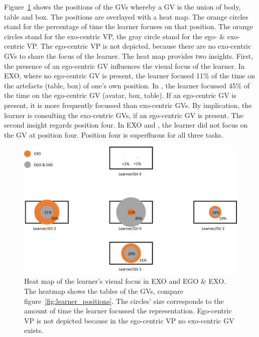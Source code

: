 Figure~\ref{fig:posHeatMap} shows the positions of the GVs whereby a GV is the union of body, table and box. The positions are overlayed with a heat map. The orange circles stand for the percentage of time the learner focuses on that position. The orange circles stand for the exo-centric VP, the gray circle stand for the ego- \& exo-centric VP. The ego-centric VP is not depicted, because there are no exo-centric GVs to share the focus of the learner. The heat map provides two insights. First, the presence of an ego-centric GV influences the visual focus of the learner. In EXO, where no ego-centric GV is present, the learner focused 11\% of the time on the artefacts (table, box) of one's own position. In \combi, the learner focussed 45\% of the time on the ego-centric GV (avatar, box, table). If an ego-centric GV is present, it is more frequently focussed than exo-centric GVs. By implication, the learner is consulting the exo-centric GVs, if an ego-centric GV is present.
The second insight regards position four. In EXO and \combi, the learner did not focus on the GV at position four. Position four is superfluous for all three tasks.
\begin{figure}[htb]
	\centering
	\includegraphics[width=\textwidth]{figures/positionHeatMap.png}
	\caption[\textit{Looking at} heat map.]{Heat map of the learner's visual focus in EXO and EGO \& EXO. The heatmap shows the tables of the GVs, compare figure~\ref{fig:learner_positions}. The circles' size corresponds to the amount of time the learner focussed the representation. Ego-centric VP is not depicted because in the ego-centric VP no exo-centric GV exists.}
	\label{fig:posHeatMap}
\end{figure}

